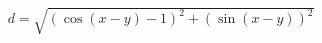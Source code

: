 \documentclass[preview]{standalone}
\begin{document}
\begin{align*}
d = \sqrt{(\cos(x - y) - 1)^2 + (\sin(x - y))^2}
\end{align*}
\end{document}
